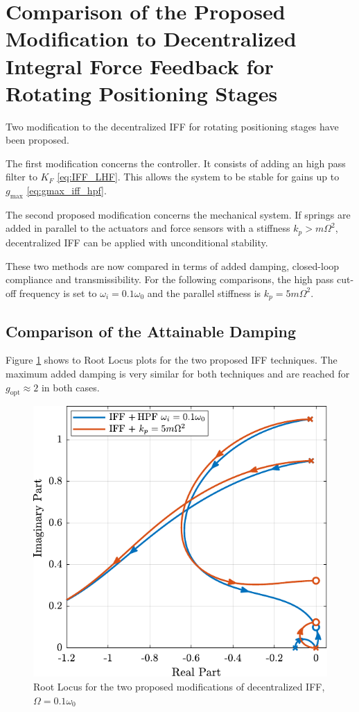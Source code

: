 \documentclass{ISMA_USD2020}
\begin{document}
\section{Comparison of the Proposed Modification to Decentralized Integral Force Feedback for Rotating Positioning Stages}
\label{sec:org1e5f410}
\label{sec:comparison}
Two modification to the decentralized IFF for rotating positioning stages have been proposed.

The first modification concerns the controller.
It consists of adding an high pass filter to \(K_F\) \eqref{eq:IFF_LHF}.
This allows the system to be stable for gains up to \(g_\text{max}\) \eqref{eq:gmax_iff_hpf}.

The second proposed modification concerns the mechanical system.
If springs are added in parallel to the actuators and force sensors with a stiffness \(k_p > m \Omega^2\), decentralized IFF can be applied with unconditional stability.

These two methods are now compared in terms of added damping, closed-loop compliance and transmissibility.
For the following comparisons, the high pass cut-off frequency is set to \(\omega_i = 0.1 \omega_0\) and the parallel stiffness is \(k_p = 5 m \Omega^2\).
\subsection{Comparison of the Attainable Damping}
\label{sec:org29462c9}
Figure \ref{fig:comp_root_locus} shows to Root Locus plots for the two proposed IFF techniques.
The maximum added damping is very similar for both techniques and are reached for \(g_\text{opt} \approx 2\) in both cases.

\begin{figure}[htbp]
\centering
\includegraphics[scale=1]{figs/comp_root_locus.pdf}
\caption{\label{fig:comp_root_locus}Root Locus for the two proposed modifications of decentralized IFF, \(\Omega = 0.1 \omega_0\)}
\end{figure}
\end{document}
